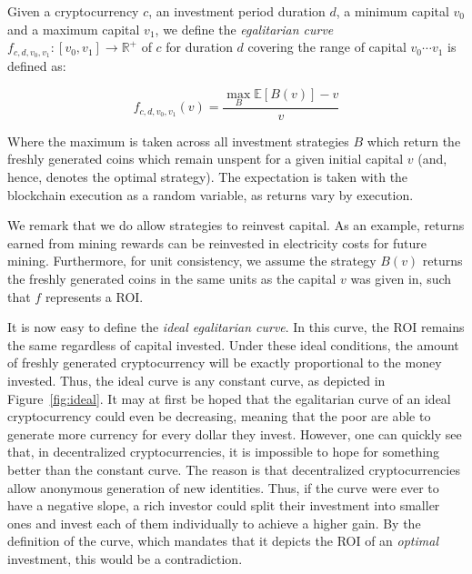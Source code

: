 \begin{definition}
  Given a cryptocurrency $c$, an investment period duration $d$, a minimum
  capital $v_0$ and a maximum capital $v_1$, we define the
  \emph{egalitarian curve}
  $f_{c,d,v_0,v_1}: [v_0, v_1] \longrightarrow \mathbb{R}^+$ of $c$ for
  duration $d$ covering the range of capital $v_0 \cdots v_1$ is defined as:

  \[
  f_{c,d,v_0,v_1}(v) = \frac{\max_B{\mathbb{E}[B(v)]} - v}{v}
  \]

  Where the maximum is taken across all investment strategies $B$ which return
  the freshly generated coins which remain unspent for a given initial capital
  $v$ (and, hence, denotes the optimal strategy). The expectation is taken with
  the blockchain execution as a random variable, as returns vary by execution.
\end{definition}

We remark that we do allow strategies to reinvest capital. As an example,
returns earned from mining rewards can be reinvested in electricity costs for
future mining. Furthermore, for unit consistency, we assume the strategy $B(v)$
returns the freshly generated coins in the same units as the capital $v$ was
given in, such that $f$ represents a ROI.

It is now easy to define the \emph{ideal egalitarian curve}. In this curve, the
ROI remains the same regardless of capital invested. Under these ideal
conditions, the amount of freshly generated cryptocurrency will be exactly
proportional to the money invested. Thus, the ideal curve is any constant curve,
as depicted in Figure~\ref{fig:ideal}. It may at first be hoped that the
egalitarian curve of an ideal cryptocurrency could even be decreasing, meaning
that the poor are able to generate more currency for every dollar they invest.
However, one can quickly see that, in decentralized cryptocurrencies, it is
impossible to hope for something better than the constant curve. The reason is
that decentralized cryptocurrencies allow anonymous generation of new
identities. Thus, if the curve were ever to have a negative slope, a rich
investor could split their investment into smaller ones and invest each of them
individually to achieve a higher gain. By the definition of the curve, which
mandates that it depicts the ROI of an \emph{optimal} investment, this would be
a contradiction.

